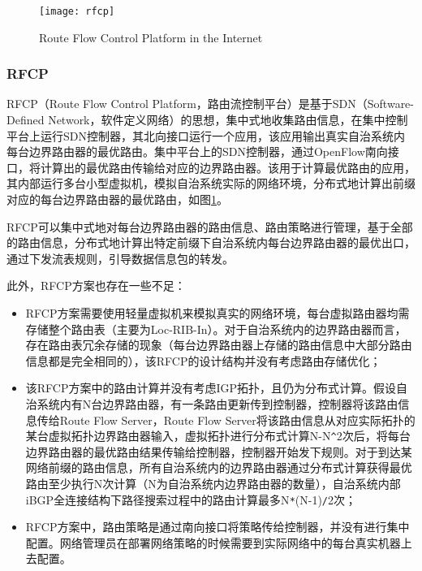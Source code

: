 \begin{figure}
  \centering
  \texttt{[image: rfcp]}
  \caption{Route Flow Control Platform in the Internet\cite{RothenbergHotSDN}}
  \label{fig:rfcp}
\end{figure}

\subsubsection{RFCP\cite{RothenbergHotSDN}}
RFCP（Route Flow Control Platform，路由流控制平台）是基于SDN\cite{sdnsurvey2014ieee}（Software-Defined Network，软件定义网络）的思想，集中式地收集路由信息，在集中控制平台上运行SDN控制器，其北向接口运行一个应用，该应用输出真实自治系统内每台边界路由器的最优路由。集中平台上的SDN控制器，通过OpenFlow\cite{openflow}南向接口，将计算出的最优路由传输给对应的边界路由器。该用于计算最优路由的应用，其内部运行多台小型虚拟机，模拟自治系统实际的网络环境，分布式地计算出前缀对应的每台边界路由器的最优路由，如图\ref{fig:rfcp}。

RFCP可以集中式地对每台边界路由器的路由信息、路由策略进行管理，基于全部的路由信息，分布式地计算出特定前缀下自治系统内每台边界路由器的最优出口，通过下发流表规则，引导数据信息包的转发。

此外，RFCP方案也存在一些不足：
\begin{itemize}
\item RFCP方案需要使用轻量虚拟机来模拟真实的网络环境，每台虚拟路由器均需存储整个路由表（主要为Loc-RIB-In）。对于自治系统内的边界路由器而言，存在路由表冗余存储的现象（每台边界路由器上存储的路由信息中大部分路由信息都是完全相同的），该RFCP的设计结构并没有考虑路由存储优化；
\item 该RFCP方案中的路由计算并没有考虑IGP拓扑，且仍为分布式计算。假设自治系统内有N台边界路由器，有一条路由更新传到控制器，控制器将该路由信息传给Route Flow Server，Route Flow Server将该路由信息从对应实际拓扑的某台虚拟拓扑边界路由器输入，虚拟拓扑进行分布式计算N-N\verb+^+2次后，将每台边界路由器的最优路由结果传输给控制器，控制器开始发下规则。对于到达某网络前缀的路由信息，所有自治系统内的边界路由器通过分布式计算获得最优路由至少执行N次计算（N为自治系统内边界路由器的数量），自治系统内部iBGP全连接结构下路径搜索过程中的路由计算最多N\verb+*+(N-1)\verb+/+2次；
\item RFCP方案中，路由策略是通过南向接口将策略传给控制器，并没有进行集中配置。网络管理员在部署网络策略的时候需要到实际网络中的每台真实机器上去配置。
\end{itemize}

